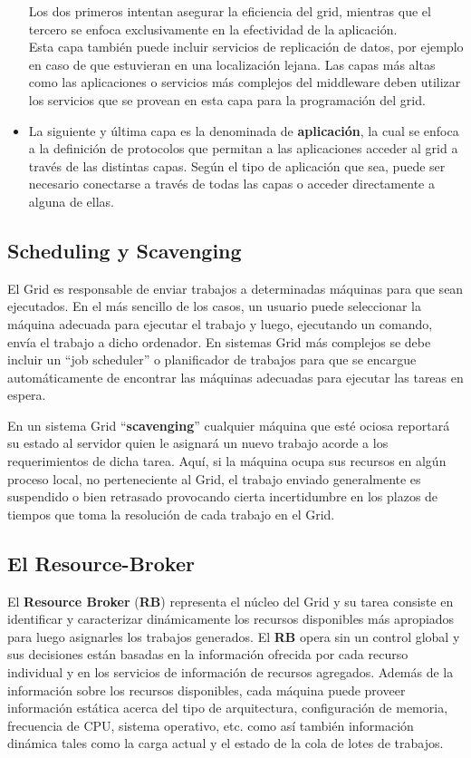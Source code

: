 \begin{itemize}
      Los dos primeros intentan asegurar la eficiencia del grid, mientras que el tercero se enfoca exclusivamente en la efectividad de la aplicación.\\

      Esta capa también puede incluir servicios de replicación de datos, por ejemplo en caso de que estuvieran en una localización lejana.
      Las capas más altas como las aplicaciones o servicios más complejos del middleware deben utilizar los servicios que se provean en esta capa para la programación del grid. 

\item La siguiente y última capa es la denominada de \textbf{aplicación}, la cual se enfoca a la definición de protocolos que permitan a las aplicaciones acceder al grid a 
través de las distintas capas. Según el tipo de aplicación que sea, puede ser necesario conectarse a través de todas las capas o acceder directamente a alguna de ellas. 

\end{itemize}

\subsection{Scheduling y Scavenging}

El Grid es responsable de enviar trabajos a determinadas máquinas para que sean ejecutados. En el más sencillo de los casos,
 un usuario puede seleccionar la máquina adecuada para ejecutar el trabajo y luego, ejecutando un comando, envía el trabajo a dicho ordenador. 
En sistemas Grid más complejos se debe incluir un “job scheduler” o planificador de trabajos para que se encargue automáticamente de encontrar 
las máquinas adecuadas para ejecutar las tareas en espera.

En un sistema Grid “\textbf{scavenging}” cualquier máquina que esté ociosa reportará su estado al servidor quien le asignará un nuevo trabajo acorde a los requerimientos de dicha tarea.
Aquí, si la máquina ocupa sus recursos en algún proceso local, no perteneciente al Grid, el trabajo enviado generalmente es suspendido o 
bien retrasado provocando cierta incertidumbre en los plazos de tiempos que toma la resolución de cada trabajo en el Grid.

\subsection{El Resource-Broker}

El \textbf{Resource Broker} (\textbf{RB}) representa el núcleo del Grid y su tarea consiste en identificar y caracterizar dinámicamente los recursos disponibles más 
apropiados para luego asignarles los trabajos generados. El \textbf{RB} opera sin un control global y sus decisiones están basadas en la información ofrecida por cada recurso
 individual y en los servicios de información de recursos agregados. Además de la información sobre los recursos disponibles, cada máquina puede proveer información 
estática acerca del tipo de arquitectura, configuración de memoria, frecuencia de CPU, sistema operativo, etc. como así también información dinámica tales como la carga
 actual y el estado de la cola de lotes de trabajos.

